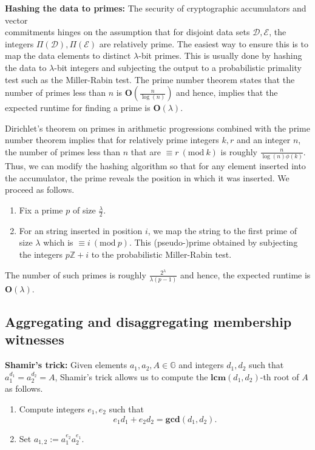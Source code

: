 \documentclass[11pt, lettersize, notitlepage, leqno, footskip=0.6cm]{article}
\newcommand{\bz}{\mathbb Z}
\newcommand{\mc}{\mathcal}
\newcommand{\mb}{\mathbb}
\newcommand{\mbf}{\mathbf}
\newcommand{\lam}{\lambda}
\newcommand{\vs}{\vspace{-0.15cm}}
\newcommand{\noin}{\noindent}
\newcommand{\Mod}[1]{\ (\mathrm{mod}\ #1)}
\newcommand{\LCM}{\mbf{lcm}}
\newcommand{\GCD}{\mbf{gcd}}
\numberwithin{equation}{section}
\begin{document}
\noin \textbf{Hashing the data to primes:} The security of cryptographic accumulators and vector\\ commitments hinges on the assumption that for disjoint data sets $\mc{D},\mc{E}$, the integers $\Pi(\mc{D}), \Pi(\mc{E})$ are relatively prime. The easiest way to ensure this is to map the data elements to distinct $\lam$-bit primes. This is usually done by hashing the data to $\lam$-bit integers and subjecting the output to a probabilistic primality test such as the Miller-Rabin test. The prime number theorem states that the number of primes less than $n$ is $\mbf{O}(\frac{n}{\log(n)})$ and hence, implies that the expected runtime for finding a prime is $\mbf{O}(\lam)$.

Dirichlet's theorem on primes in arithmetic progressions combined with the prime number theorem implies that for relatively prime integers $k,r$ and an integer $n$, the number of primes less than $n$ that are $\equiv r\Mod{k}$ is roughly $\frac{n}{\log(n)\phi(k)}$. Thus, we can modify the hashing algorithm so that for any element inserted into the accumulator, the prime reveals the position in which it was inserted. We proceed as follows.\vspace{0.1cm} \begin{enumerate}[wide, labelwidth=!, labelindent=0pt] 

\item Fix a prime $p$ of size $\frac{\lam}{2}$. 

\item For an string inserted in position $i$, we map the string to the first prime of size $\lam$ which is $\equiv i\Mod{p}$. This (pseudo-)prime obtained by subjecting the integers $p\bz+i$ to the probabilistic Miller-Rabin test. \end{enumerate} \vspace{0.1cm}

\noin The number of such primes is roughly \vs $\frac{2^{\lam}}{\lam (p-1)}$ and hence, the expected runtime is $\mbf{O}(\lam)$.






\subsection{\fontsize{11}{11} Aggregating and disaggregating membership witnesses}

\noindent \textbf{Shamir's trick:} Given elements $a_1, a_2, A\in \mb{G}$ and integers $d_1, d_2$ such that $a_1^{d_1} = a_2^{d_2} = A$, Shamir's trick allows us to compute the $\LCM(d_1, d_2)$-th root of $A$ as follows. \begin{enumerate}[wide, labelwidth=!, labelindent=0pt] 

\item Compute integers $e_1, e_2$ such that \vs $$e_1d_1+e_2d_2 = \GCD(d_1, d_2).$$

\item Set $a_{1,2}:= a_1^{e_2}a_2^{e_1} $. \end{enumerate}
\end{document}
